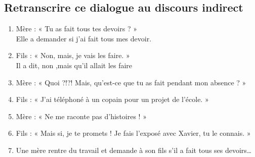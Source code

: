 \documentclass[12pt]{article}
\begin{document}
\subsection{Retranscrire ce dialogue au discours indirect }
\begin{enumerate}
	\item Mère : « Tu as fait tous tes devoirs ? » \\
	 Elle a demander si j'ai fait tous mes devoir.
	\item Fils : « Non, mais, je vais les faire. » \\
	 Il a dit, non ,mais qu'il allait les faire
	\item Mère : « Quoi ?!?! Mais, qu’est-ce que tu as fait pendant mon absence ? » \\
	\item Fils : « J’ai téléphoné à un copain pour un projet de l’école. » \\
	\item Mère : « Ne me raconte pas d’histoires ! » \\
	\item Fils : « Mais si, je te promets ! Je fais l’exposé avec Xavier, tu le connais. »\\
	\item Une mère rentre du travail et demande à son fils s’il a fait tous ses devoirs…\\
\end{enumerate}
\end{document}
